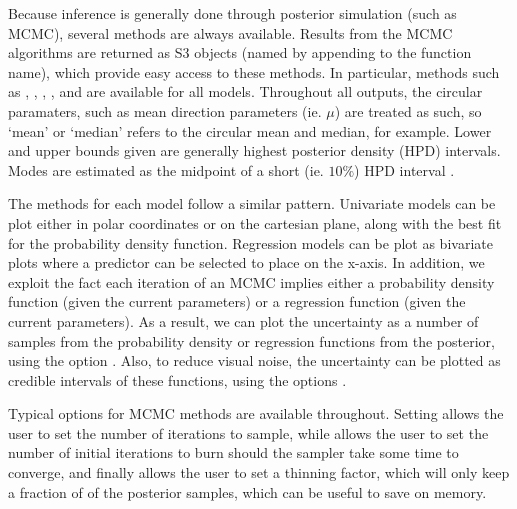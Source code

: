 Because inference is generally done through posterior simulation (such
as MCMC), several methods are always available. Results from the MCMC
algorithms are returned as S3 objects (named by appending  to
the function name), which provide easy access to these methods. In
particular, methods such as , ,
, ,  and 
are available for all models. Throughout all outputs, the circular
paramaters, such as mean direction parameters (ie. \(\mu\)) are treated
as such, so `mean' or `median' refers to the circular mean and median,
for example. Lower and upper bounds given are generally highest
posterior density (HPD) intervals. Modes are estimated as the midpoint
of a short (ie. \(10\%\)) HPD interval \citep{venter1967estimation}.

The  methods for each model follow a similar pattern.
Univariate models can be plot either in polar coordinates or on the
cartesian plane, along with the best fit for the probability density
function. Regression models can be plot as bivariate plots where a
predictor can be selected to place on the x-axis. In addition, we
exploit the fact each iteration of an MCMC implies either a probability
density function (given the current parameters) or a regression function
(given the current parameters). As a result, we can plot the uncertainty
as a number of samples from the probability density or regression
functions from the posterior, using the option . Also,
to reduce visual noise, the uncertainty can be plotted as credible
intervals of these functions, using the options .

Typical options for MCMC methods are available throughout. Setting
 allows the user to set the number of iterations to sample,
while  allows the user to set the number of initial
iterations to burn should the sampler take some time to converge, and
finally  allows the user to set a thinning factor, which will
only keep a fraction of  of the posterior samples, which
can be useful to save on memory.

